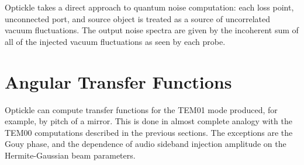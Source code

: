 \documentclass[12pt]{article}
\begin{document}
Optickle takes a direct approach to quantum noise computation:
 each loss point, unconnected port, and source object is treated as a source of
 uncorrelated vacuum fluctuations.
The output noise spectra are given by the incoherent sum of all of the injected vacuum
 fluctuations as seen by each probe.

\section{Angular Transfer Functions}

Optickle can compute transfer functions for the TEM01 mode produced, for example, by pitch of a mirror.
This is done in almost complete analogy with the TEM00 computations described in the previous sections.
The exceptions are the Gouy phase, and the dependence of audio sideband injection amplitude on the Hermite-Gaussian beam parameters.

\end{document}
